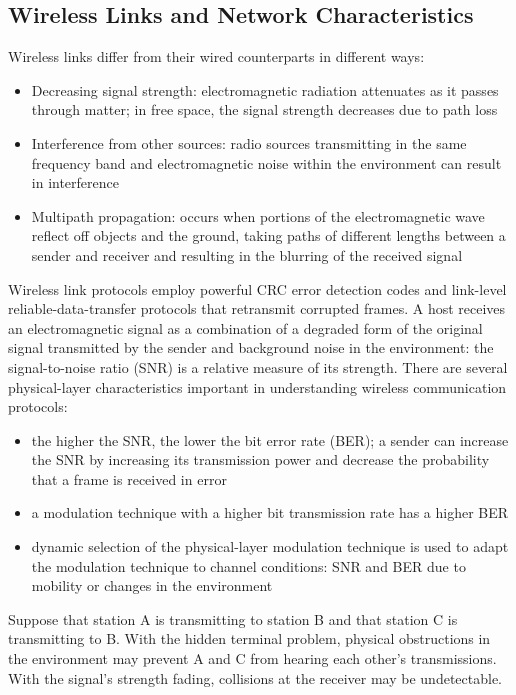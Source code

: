 \documentclass{article}
\begin{document}
\subsection{Wireless Links and Network Characteristics}
Wireless links differ from their wired counterparts in different ways: 
\begin{itemize}
    \item Decreasing signal strength: electromagnetic radiation attenuates as it passes through matter; in free space, the signal strength decreases due to path loss
    \item Interference from other sources: radio sources transmitting in the same frequency band and electromagnetic noise within the environment can result in interference
    \item Multipath propagation: occurs when portions of the electromagnetic wave reflect off objects and the ground, taking paths of different lengths between a sender and receiver and resulting in the blurring of the received signal
\end{itemize}
Wireless link protocols employ powerful CRC error detection codes and link-level reliable-data-transfer protocols that retransmit corrupted frames.
A host receives an electromagnetic signal as a combination of a degraded form of the original signal transmitted by the sender and background noise in the environment: the signal-to-noise ratio (SNR) is a relative measure of its strength.
There are several physical-layer characteristics important in understanding wireless communication protocols:
\begin{itemize}
    \item the higher the SNR, the lower the bit error rate (BER); a sender can increase the SNR by increasing its transmission power and decrease the probability that a frame is received in error
    \item a modulation technique with a higher bit transmission rate has a higher BER
    \item dynamic selection of the physical-layer modulation technique is used to adapt the modulation technique to channel conditions: SNR and BER due to mobility or changes in the environment
\end{itemize}
Suppose that station A is transmitting to station B and that station C is transmitting to B.
With the hidden terminal problem, physical obstructions in the environment may prevent A and C from hearing each other’s transmissions.
With the signal's strength fading, collisions at the receiver may be undetectable. 
\end{document}

